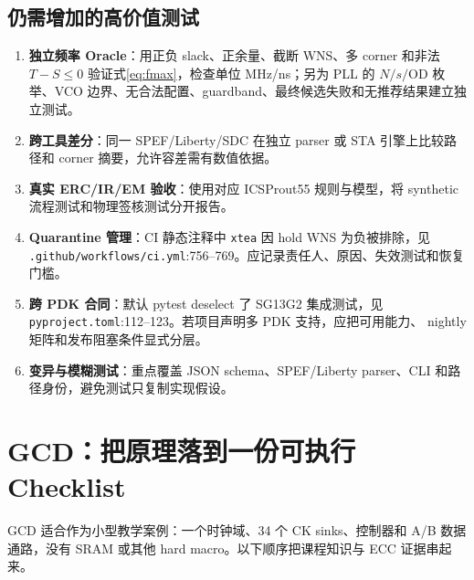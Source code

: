 \documentclass[UTF8,a4paper,11pt,fontset=fandol]{ctexart}
\numberwithin{equation}{section}
\newcommand{\code}[1]{\nolinkurl{#1}}
\begin{document}
\subsection{仍需增加的高价值测试}

\begin{enumerate}
  \item \textbf{独立频率 Oracle}：用正负 slack、正余量、截断 WNS、多 corner 和非法 $T-S\le0$ 验证式\eqref{eq:fmax}，检查单位 MHz/ns；另为 PLL 的 $N/s/\mathrm{OD}$ 枚举、VCO 边界、无合法配置、guardband、最终候选失败和无推荐结果建立独立测试。
  \item \textbf{跨工具差分}：同一 SPEF/Liberty/SDC 在独立 parser 或 STA 引擎上比较路径和 corner 摘要，允许容差需有数值依据。
  \item \textbf{真实 ERC/IR/EM 验收}：使用对应 ICSProut55 规则与模型，将 synthetic 流程测试和物理签核测试分开报告。
  \item \textbf{Quarantine 管理}：CI 静态注释中 \code{xtea} 因 hold WNS 为负被排除，见 \code{.github/workflows/ci.yml}:756--769。应记录责任人、原因、失效测试和恢复门槛。
  \item \textbf{跨 PDK 合同}：默认 pytest deselect 了 SG13G2 集成测试，见 \code{pyproject.toml}:112--123。若项目声明多 PDK 支持，应把可用能力、 nightly 矩阵和发布阻塞条件显式分层。
  \item \textbf{变异与模糊测试}：重点覆盖 JSON schema、SPEF/Liberty parser、CLI 和路径身份，避免测试只复制实现假设。
\end{enumerate}

\section{GCD：把原理落到一份可执行 Checklist}

GCD 适合作为小型教学案例：一个时钟域、34 个 CK sinks、控制器和 A/B 数据通路，没有 SRAM 或其他 hard macro。以下顺序把课程知识与 ECC 证据串起来。
\end{document}
